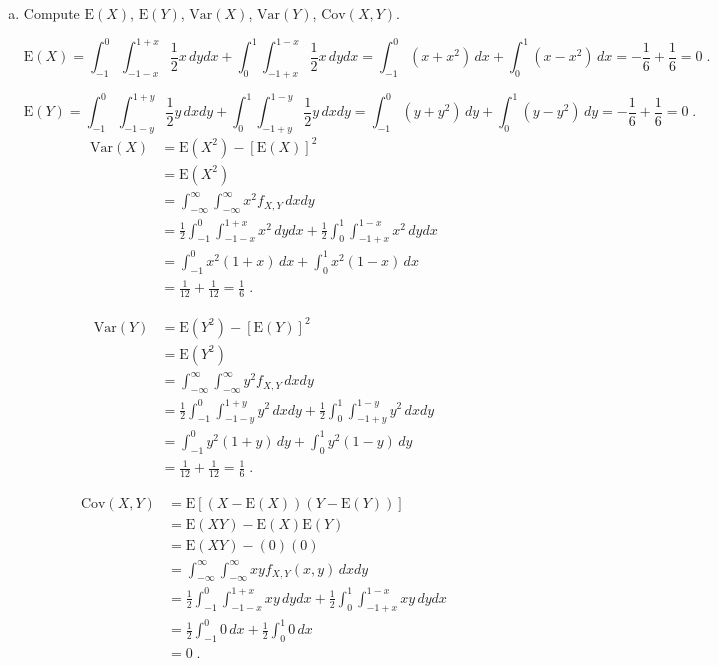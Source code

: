 \documentclass[letterpaper,12pt,fleqn]{article}
\begin{document}
\begin{enumerate}
\begin{enumerate}[(a)]
\item Compute $\mbox{E}(X)$, $\mbox{E}(Y)$, $\mbox{Var}(X)$, $\mbox{Var}(Y)$, $\mbox{Cov}(X, Y)$. 

$$\mbox{E}(X) = \int_{-1}^{0} \int_{-1-x}^{1+x} \frac{1}{2}x \, dydx + \int_{0}^{1} \int_{-1+x}^{1-x} \frac{1}{2}x \, dydx=\int_{-1}^{0} (x+x^2) \, dx + \int_{0}^{1} (x-x^2) \, dx = -\frac{1}{6} + \frac{1}{6} = 0 \;.$$

$$\mbox{E}(Y) = \int_{-1}^{0} \int_{-1-y}^{1+y} \frac{1}{2}y \, dxdy + \int_{0}^{1} \int_{-1+y}^{1-y} \frac{1}{2}y \, dxdy=\int_{-1}^{0} (y+y^2) \, dy + \int_{0}^{1} (y-y^2) \, dy = -\frac{1}{6} + \frac{1}{6} = 0 \;.$$
\begin{align*}\mbox{Var}(X) &= \mbox{E}(X^2) - [\mbox{E}(X)]^2 \\&= \mbox{E}(X^2) \\ & = \int_{-\infty}^{\infty}\int_{-\infty}^{\infty} x^2f_{X,Y} \, dxdy \\&= \frac{1}{2}\int_{-1}^{0}\int_{-1-x}^{1+x} x^2 \, dydx + \frac{1}{2} \int_{0}^{1} \int_{-1+x}^{1-x} x^2 \, dydx \\
&= \int_{-1}^{0} x^2(1+x) \, dx + \int_{0}^{1} x^2(1-x) \,dx \\ &= \frac{1}{12} + \frac{1}{12} = \frac{1}{6} \;.
\end{align*}

\begin{align*}\mbox{Var}(Y) &= \mbox{E}(Y^2) - [\mbox{E}(Y)]^2 \\&= \mbox{E}(Y^2) \\ & = \int_{-\infty}^{\infty}\int_{-\infty}^{\infty} y^2f_{X,Y} \, dxdy \\&= \frac{1}{2}\int_{-1}^{0}\int_{-1-y}^{1+y} y^2 \, dxdy + \frac{1}{2} \int_{0}^{1} \int_{-1+y}^{1-y} y^2 \, dxdy \\
&= \int_{-1}^{0} y^2(1+y) \, dy + \int_{0}^{1} y^2(1-y) \,dy \\ &= \frac{1}{12} + \frac{1}{12} = \frac{1}{6} \;.
\end{align*}

\begin{align*}
\mbox{Cov}(X,Y) &= \mbox{E}[(X-\mbox{E}(X))(Y-\mbox{E}(Y))] \\&= \mbox{E}(XY) - \mbox{E}(X)\mbox{E}(Y) \\
&= \mbox{E} (XY) - (0)(0) \\
&= \int_{-\infty}^{\infty} \int_{-\infty}^{\infty} xyf_{X,Y}(x,y) \, dxdy \\
&= \frac{1}{2} \int_{-1}^{0} \int_{-1-x}^{1+x} xy \, dydx + \frac{1}{2} \int_{0}^{1} \int_{-1+x}^{1-x} xy \, dydx \\
&= \frac{1}{2} \int_{-1}^{0} 0 \, dx + \frac{1}{2} \int_{0}^{1} 0 \, dx \\ &= 0 \;.
\end{align*}
\end{enumerate}

\end{enumerate}
\end{document}
